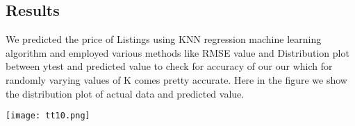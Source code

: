 \subsection{Results}
\label{sec:others}

\begin{block}
\color{gray}

We predicted the price of Listings using KNN regression machine learning algorithm and employed various methods like RMSE value and Distribution plot between ytest and predicted value to check for accuracy of our our which for randomly varying values of K comes pretty accurate.
Here in the figure we show the distribution plot of actual data and predicted value.

\texttt{[image: tt10.png]} 

\end{block}